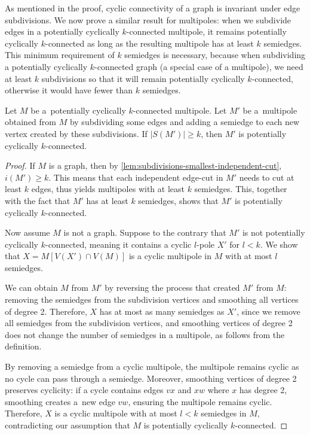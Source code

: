 \documentclass[12pt, twoside]{book}
\begin{document}
As mentioned in the proof, cyclic connectivity of a graph is invariant under edge subdivisions. We now prove a similar result for multipoles: when we subdivide edges in a potentially cyclically \mbox{$k$-connected} multipole, it remains potentially cyclically \mbox{$k$-connected} as long as the resulting multipole has at least $k$ semiedges. This minimum requirement of $k$ semiedges is necessary, because when subdividing a potentially cyclically $k$-connected graph (a special case of a multipole), we need at least $k$ subdivisions so that it will remain potentially cyclically $k$-connected, otherwise it would have fewer than $k$ semiedges.

\begin{theorem}\label{th:subdivisions-potentially-cyclically-connected}
	Let $M$ be a~potentially cyclically $k$-connected multipole. Let $M'$ be a~multipole obtained from $M$ by subdividing some edges and adding a semiedge to each new vertex created by these subdivisions. If $|S(M')|\geq k$, then $M'$ is potentially cyclically $k$-connected.
\end{theorem}

\begin{proof}
	If $M$ is a graph, then by \cref{lem:subdivisions-smallest-independent-cut}, $i(M')\geq k$. This means that each independent edge-cut in $M'$ needs to cut at least $k$ edges, thus yields multipoles with at least $k$ semiedges. This, together with the fact that $M'$ has at least $k$ semiedges, shows that $M'$ is potentially cyclically $k$-connected.
	
	Now assume $M$ is not a graph. Suppose to the contrary that $M'$ is not potentially cyclically $k$-connected, meaning it contains a cyclic $l$-pole $X'$ for $l<k$. We show that $X=M[V(X')\cap V(M)]$ is a cyclic multipole in $M$ with at most $l$ semiedges.
	
	We can obtain $M$ from $M'$ by reversing the process that created $M'$ from $M$: removing the semiedges from the subdivision vertices and smoothing all vertices of degree 2. Therefore, $X$ has at most as many semiedges as $X'$, since we remove all semiedges from the subdivision vertices, and smoothing vertices of degree 2 does not change the number of semiedges in a multipole, as follows from the definition.
	
	By removing a semiedge from a cyclic multipole, the multipole remains cyclic as no cycle can pass through a semiedge. Moreover, smoothing vertices of degree 2 preserves cyclicity: if a cycle contains edges $vx$ and $xw$ where $x$ has degree 2, smoothing creates a~new edge $vw$, ensuring the multipole remains cyclic. Therefore, $X$ is a cyclic multipole with at most $l<k$ semiedges in $M$, contradicting our assumption that $M$ is potentially cyclically $k$-connected.
\end{proof}
\end{document}
